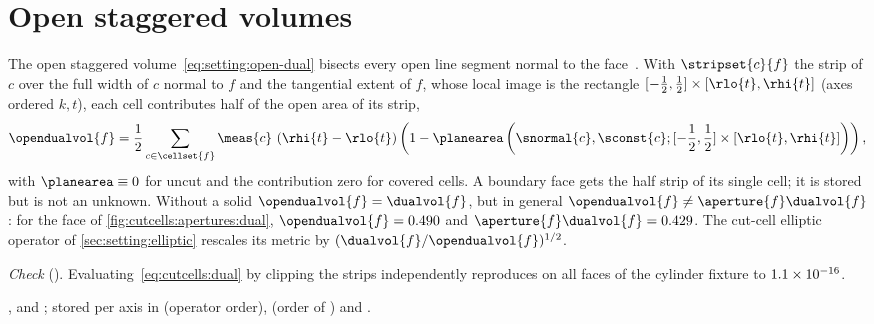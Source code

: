 \section{Open staggered volumes}\label{sec:cutcells:dual}
The open staggered volume~\cref{eq:setting:open-dual} bisects every open line
segment normal to the face~\cite{verstappen2005}. With
$\stripset{c}{f}$ the strip of $c$ over the full width of $c$ normal to $f$
and the tangential extent of $f$, whose local image is the rectangle
$[-\half,\half]\times[\rlo{t},\rhi{t}]$ (axes ordered $k,t$), each cell
contributes half of the open area of its strip,
\begin{equation}\label{eq:cutcells:dual}
  \opendualvol{f}=\half\sum_{c\in\cellset{f}}\meas{c}\,\roundpar{\rhi{t}-\rlo{t}}
    \roundpar{1-\planearea\roundpar{\snormal{c},\sconst{c};[-\half,\half]\times[\rlo{t},\rhi{t}]}},
\end{equation}
with $\planearea\equiv0$ for uncut and the contribution zero for covered
cells. A boundary face gets the half strip of its single cell; it is stored
but is not an unknown. Without a solid $\opendualvol{f}=\dualvol{f}$, but in
general $\opendualvol{f}\neq\aperture{f}\dualvol{f}$: for the face of
\cref{fig:cutcells:apertures:dual}, $\opendualvol{f}=\chkDualFace$ and
$\aperture{f}\dualvol{f}=\chkApertureDual$. The cut-cell elliptic operator
of \cref{sec:setting:elliptic} rescales its metric by
$(\dualvol{f}/\opendualvol{f})^{1/2}$.

\emph{Check} (). Evaluating~\cref{eq:cutcells:dual}
by clipping the strips independently reproduces 
on all faces of the cylinder fixture to $1.1\times10^{-16}$.



\begin{implnote}
,
 and
; stored per axis in
 (operator order),  (order of
) and .
\end{implnote}

